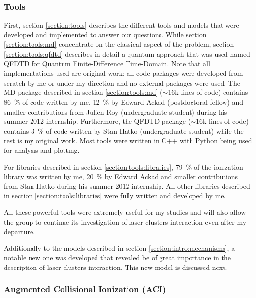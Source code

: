 

\subsubsection{Tools}

First, section \ref{section:tools} describes the different tools and models
that were developed and implemented to answer our questions. While section
\ref{section:tools:md} concentrate on the classical aspect of the problem,
section \ref{section:tools:qfdtd} describes in detail a quantum approach that
was used named QFDTD for Quantum Finite-Difference Time-Domain.
Note that all implementations used are original work; all code packages
were developed from scratch by me or under my
direction
and no external packages
were used. The MD package described in
section \ref{section:tools:md} ($\sim$16k lines of code) contains 86~\% of code
written by me, 12~\% by Edward Ackad (postdoctoral fellow) and smaller contributions from
Julien Roy (undergraduate student) during his summer 2012 internship. Furthermore, the QFDTD package
($\sim$16k lines of code) contains 3~\% of code written by Stan Hatko (undergraduate student) while the
rest is my original work. Most tools were written in C++ with Python being used
for analysis and plotting.

For libraries described in section \ref{section:tools:libraries}, 79~\% of the
ionization library was written by me, 20~\% by Edward Ackad and smaller
contributions from Stan Hatko during his summer 2012 internship. All other
libraries described in section \ref{section:tools:libraries} were fully
written and developed by me.


All these powerful tools were extremely useful for my studies and will also allow
the group to continue its investigation of laser-clusters interaction even
after my departure.

Additionally to the models described in
section \ref{section:intro:mechanisms}, a notable new one was
developed that revealed be of great importance in the description of
laser-clusters interaction. This new model is discussed next.


\subsubsection{Augmented Collisional Ionization (ACI)}

